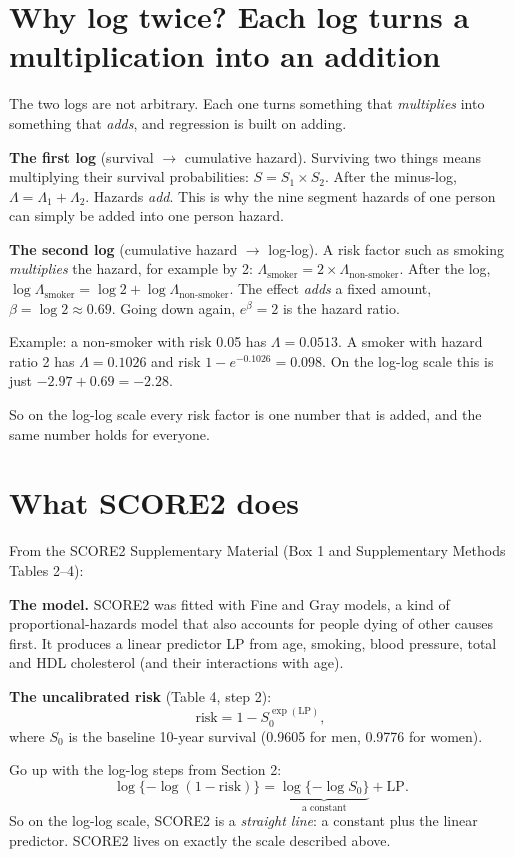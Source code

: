 \documentclass[11pt]{article}
\newcommand{\up}{\textcolor{blue!70!black}}
\begin{document}
\section{Why log twice? Each log turns a multiplication into an addition}

The two logs are not arbitrary. Each one turns something that \emph{multiplies} into something
that \emph{adds}, and regression is built on adding.

\textbf{The first log} (survival $\to$ cumulative hazard).
Surviving two things means multiplying their survival probabilities:
$S = S_1 \times S_2$. After the minus-log, $\Lambda = \Lambda_1 + \Lambda_2$.
Hazards \emph{add}. This is why the nine segment hazards of one person can simply be added into
one person hazard.

\textbf{The second log} (cumulative hazard $\to$ log-log).
A risk factor such as smoking \emph{multiplies} the hazard, for example by 2:
$\Lambda_{\text{smoker}} = 2 \times \Lambda_{\text{non-smoker}}$.
After the log, $\log\Lambda_{\text{smoker}} = \log 2 + \log\Lambda_{\text{non-smoker}}$.
The effect \emph{adds} a fixed amount, $\beta = \log 2 \approx 0.69$. Going down again,
$e^{\beta} = 2$ is the hazard ratio.

Example: a non-smoker with risk 0.05 has $\Lambda = 0.0513$. A smoker with hazard ratio 2 has
$\Lambda = 0.1026$ and risk $1 - e^{-0.1026} = 0.098$. On the log-log scale this is just
$-2.97 + 0.69 = -2.28$.

So on the log-log scale every risk factor is one number that is added, and the same number
holds for everyone.

\section{What SCORE2 does}

From the SCORE2 Supplementary Material (Box 1 and Supplementary Methods Tables 2--4):

\textbf{The model.} SCORE2 was fitted with Fine and Gray models, a kind of proportional-hazards
model that also accounts for people dying of other causes first. It produces a linear predictor
LP from age, smoking, blood pressure, total and HDL cholesterol (and their interactions with
age).

\textbf{The uncalibrated risk} (Table 4, step 2):
\[
  \text{risk} = 1 - S_0^{\exp(\text{LP})},
\]
where $S_0$ is the baseline 10-year survival (0.9605 for men, 0.9776 for women).

Go \up{up} with the log-log steps from Section 2:
\[
  \log\{-\log(1-\text{risk})\} = \underbrace{\log\{-\log S_0\}}_{\text{a constant}} + \text{LP}.
\]
So on the log-log scale, SCORE2 is a \emph{straight line}: a constant plus the linear predictor.
SCORE2 lives on exactly the scale described above.
\end{document}
